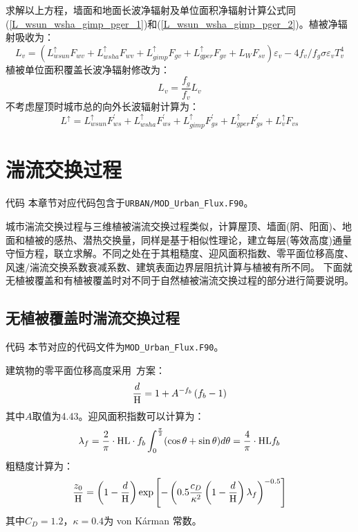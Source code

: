 求解以上方程，墙面和地面长波净辐射及单位面积净辐射计算公式同(\ref{L_wsun_wsha_gimp_pger_1})和(\ref{L_wsun_wsha_gimp_pger_2})。植被净辐射吸收为：
\begin{equation}
L_{v}=\left(L_{wsun}^{\uparrow} F_{wv}+L_{wsha}^{\uparrow} F_{wv}+L_{gimp}^{\uparrow} F_{gv}+L_{gper}^{\uparrow} F_{g v}+L_{W} F_{sv}\right) \varepsilon_{v}-4 f_{v} / f_{g} \sigma \varepsilon_{v} T_{v}^{4}
\end{equation}
植被单位面积覆盖长波净辐射修改为：
\begin{equation}
L_{v}=\frac{f_{g}}{f_{v}} L_{v}
\end{equation}
不考虑屋顶时城市总的向外长波辐射计算为：
\begin{equation}
L^{\uparrow}=L_{wsun}^{\uparrow} F_{ws}^{\prime}+L_{wsha}^{\uparrow} F_{ws}^{\prime}+L_{gimp}^{\uparrow} F_{gs}^{\prime}+L_{gper}^{\uparrow} F_{gs}^{\prime}+L_{v}^{\uparrow} F_{v s}
\end{equation}
\section{湍流交换过程}\label{城市湍流过程}
\begin{mymdframed}{代码}
本章节对应代码包含于\texttt{URBAN/MOD\_Urban\_Flux.F90}。
\end{mymdframed}

城市湍流交换过程与三维植被湍流交换过程类似，计算屋顶、墙面(阴、阳面)、地面和植被的感热、潜热交换量，同样是基于相似性理论，建立每层(等效高度)通量守恒方程，联立求解。不同之处在于其粗糙度、迎风面积指数、零平面位移高度、风速/湍流交换系数衰减系数、建筑表面边界层阻抗计算与植被有所不同。
下面就无植被覆盖和有植被覆盖时对不同于自然植被湍流交换过程的部分进行简要说明。

\subsection{无植被覆盖时湍流交换过程}\label{无植被覆盖时湍流交换过程}
\begin{mymdframed}{代码}
本节对应的代码文件为\texttt{MOD\_Urban\_Flux.F90}。
\end{mymdframed}

建筑物的零平面位移高度采用~\citet{macdonald1998improved}方案：
\begin{equation}
\frac{d}{\rm H}=1+A^{-f_{b}}\left(f_{b}-1\right)
\end{equation}
其中$A$取值为4.43。迎风面积指数可以计算为：
\begin{equation}
\lambda_{f}=\frac{2}{\pi} \cdot {\rm HL} \cdot f_{b} \int_{0}^{\frac{\pi}{2}}(\cos \theta+\sin \theta) d \theta=\frac{4}{\pi} \cdot {\rm HL} f_{b}
\end{equation}
粗糙度计算为：
\begin{equation}
\frac{z_{0}}{\rm H}=\left(1-\frac{d}{\rm H}\right) \exp \left[-\left(0.5 \frac{c_{D}}{\kappa^{2}}\left(1-\frac{d}{\rm H}\right) \lambda_{f}\right)^{-0.5}\right]
\end{equation}
其中$C_D=1.2$，$\kappa=0.4$为 von K\'arman 常数。

